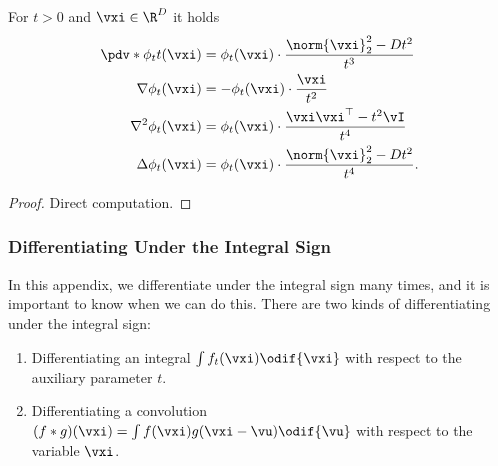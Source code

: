 \documentclass[../../book-main.tex]{subfiles}
\begin{document}
\begin{proposition}\label{prop:normal_derivatives}
    For \(t > 0\) and \(\vxi \in \R^{D}\) it holds
    \begin{align}
        \pdv*{\phi_{t}}{t}(\vxi)
        &= \phi_{t}(\vxi) \cdot \frac{\norm{\vxi}_{2}^{2} - Dt^{2}}{t^{3}} \\
        \nabla \phi_{t}(\vxi)
        &= -\phi_{t}(\vxi)\cdot\frac{\vxi}{t^{2}} \\
        \nabla^{2} \phi_{t}(\vxi)
        &= \phi_{t}(\vxi)\cdot\frac{\vxi\vxi^{\top} - t^{2}\vI}{t^{4}} \\
        \Delta \phi_{t}(\vxi)
        &= \phi_{t}(\vxi) \cdot \frac{\norm{\vxi}_{2}^{2} - Dt^{2}}{t^{4}}.
    \end{align}
\end{proposition}
\begin{proof}
    Direct computation.
\end{proof}

\subsubsection{Differentiating Under the Integral Sign}

In this appendix, we differentiate under the integral sign many
times, and it is important to know when we can do this. There are two
kinds of differentiating under the integral sign:
\begin{enumerate}
    \item Differentiating an integral \(\int f_{t}(\vxi)\odif{\vxi}\)
        with respect to the auxiliary parameter \(t\).
    \item Differentiating a convolution \((f * g)(\vxi) = \int
        f(\vxi)g(\vxi - \vu)\odif{\vu}\) with respect to the variable \(\vxi\).
\end{enumerate}
\end{document}
